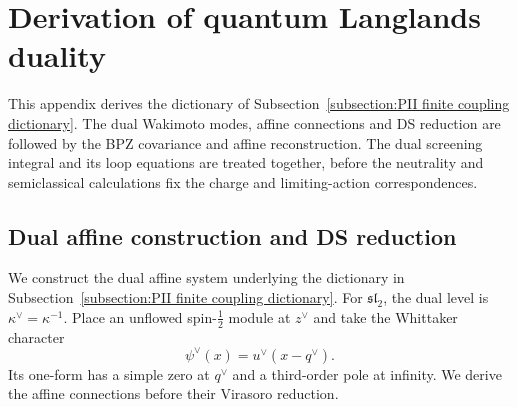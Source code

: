 \documentclass[a4paper,11pt]{article}
\newcommand{\slTwo}{\mathfrak{sl}_{2}}
\numberwithin{equation}{section}
\begin{document}
\section{Derivation of quantum Langlands duality}
\label{appendix:PII finite coupling verification}
\label{appendix:PII Wakimoto computations}

This appendix derives the dictionary of
Subsection~\ref{subsection:PII finite coupling dictionary}.
The dual Wakimoto modes, affine connections and DS reduction are
followed by the BPZ covariance and affine reconstruction.  The dual
screening integral and its loop equations are treated together,
before the neutrality and semiclassical calculations fix the charge
and limiting-action correspondences.

\subsection{Dual affine construction and DS reduction}
\label{subsection:PII dual affine construction}

We construct the dual affine system underlying the dictionary in
Subsection~\ref{subsection:PII finite coupling dictionary}.  For
$\slTwo$, the dual level is $\kappa^{\vee}=\kappa^{-1}$.
Place an unflowed spin-$\frac{1}{2}$ module at $z^{\vee}$ and
take the Whittaker character
\begin{equation}
	\psi^{\vee}(x)=u^{\vee}(x-q^{\vee}).
\end{equation}
Its one-form has a simple zero at $q^{\vee}$ and a third-order
pole at infinity.  We derive the affine connections before their
Virasoro reduction.
\end{document}
